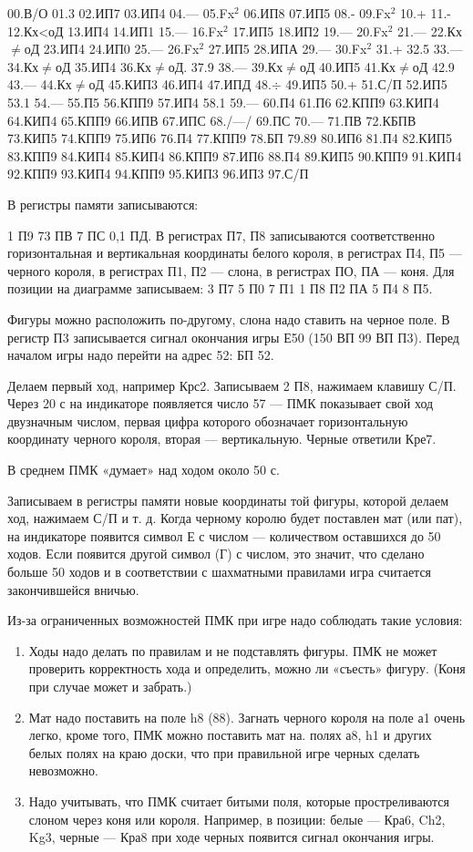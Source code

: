 \documentclass[11pt,a4paper,oneside]{article}
\begin{document}
00.В/О 01.3 02.ИП7 03.ИП4 04.— 05.Fx$^{2}$ 06.ИП8 07.ИП5 08.- 09.Fx$^{2}$
10.+ 11.- 12.Кх<оД 13.ИП4 14.ИП1 15.—	16.Fx$^{2}$ 17.ИП5 18.ИП2	19.—
20.Fx$^{2}$ 21.— 22.Кх$\neq$оД 23.ИП4 24.ИП0 25.— 26.Fx$^{2}$ 27.ИП5 28.ИПА 29.— 30.Fx$^{2}$ 31.+ 32.5 33.— 34.Кх$\neq$оД
35.ИП4 36.Кх$\neq$оД. 37.9 38.—
39.Кх$\neq$оД 40.ИП5 41.Кх$\neq$оД 42.9
43.— 44.Кх$\neq$оД 45.КИП3 46.ИП4 47.ИПД 48.$\div$ 49.ИП5 50.+ 51.С/П
52.ИП5 53.1 54.— 55.П5 56.КПП9
57.ИП4 58.1 59.— 60.П4 61.П6 62.КПП9 63.КИП4 64.КИП4 65.КПП9 66.ИПВ 67.ИПС 68./—/ 69.ПС 70.— 71.ПВ 72.КБПВ 73.КИП5 74.КПП9 75.ИП6 76.П4 77.КПП9 78.БП 79.89 80.ИП6 81.П4 82.КИП5 83.КПП9 84.КИП4
85.КИП4 86.КПП9 87.ИП6 88.П4
89.КИП5 90.КПП9 91.КИП4 92.КПП9 93.КИП4 94.КПП9 95.КИП3 96.ИП3 97.С/П

В регистры памяти записываются:

1 П9 73 ПВ 7 ПС 0,1 ПД. В регистрах П7, П8 записываются соответственно горизонтальная и вертикальная координаты белого короля, в регистрах П4, П5 — черного короля, в регистрах П1, П2 — слона, в регистрах ПО, ПА — коня. Для позиции на диаграмме записываем: 3 П7 5 П0 7 П1 1 П8 П2 ПА 5 П4 8 П5.

Фигуры можно расположить по-другому, слона надо ставить на черное поле. В регистр П3 записывается сигнал окончания игры Е50 (150 ВП 99 ВП П3). Перед началом игры надо перейти на адрес 52: БП 52.

Делаем первый ход, например Крс2. Записываем 2 П8, нажимаем клавишу С/П. Через 20 с на индикаторе появляется число 57 — ПМК показывает свой ход двузначным числом, первая цифра которого обозначает горизонтальную координату черного короля, вторая — вертикальную. Черные ответили Кре7.

В среднем ПМК «думает» над ходом около 50 с.

Записываем в регистры памяти новые координаты той фигуры, которой делаем ход, нажимаем С/П и т. д. Когда черному королю будет поставлен мат (или пат), на индикаторе появится символ Е с числом — количеством оставшихся до 50 ходов. Если появится другой символ (Г) с числом, это значит, что сделано больше 50 ходов и в соответствии с шахматными правилами игра считается закончившейся вничью.

Из-за ограниченных возможностей ПМК при игре надо соблюдать такие условия:
\begin{enumerate}
\item Ходы надо делать по правилам и не подставлять фигуры. ПМК не может проверить корректность хода и определить, можно ли «съесть» фигуру. (Коня при случае может и забрать.)
\item Мат надо поставить на поле h8 (88). Загнать черного короля на поле а1 очень легко, кроме того, ПМК можно поставить мат на. полях а8, h1 и других белых полях на краю доски, что при правильной игре черных сделать невозможно.
\item Надо учитывать, что ПМК считает битыми поля, которые простреливаются слоном через коня или короля. Например, в позиции: белые — Кра6, Ch2, Kg3, черные — Кра8 при ходе черных появится сигнал окончания игры.
\end{enumerate}
\end{document}
